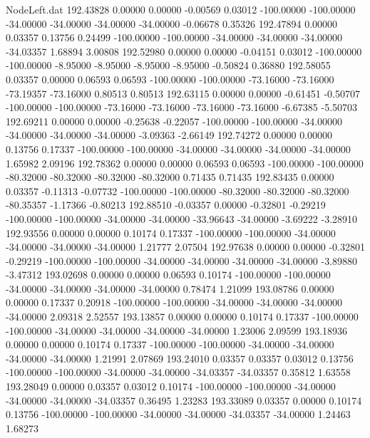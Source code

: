 \begin{filecontents}{NodeLeft.dat}
 192.43828    0.00000    0.00000    -0.00569    0.03012 -100.00000 -100.00000  -34.00000  -34.00000  -34.00000  -34.00000   -0.06678    0.35326
 192.47894    0.00000    0.03357     0.13756    0.24499 -100.00000 -100.00000  -34.00000  -34.00000  -34.00000  -34.03357    1.68894    3.00808
 192.52980    0.00000    0.00000    -0.04151    0.03012 -100.00000 -100.00000   -8.95000   -8.95000   -8.95000   -8.95000   -0.50824    0.36880
 192.58055    0.03357    0.00000     0.06593    0.06593 -100.00000 -100.00000  -73.16000  -73.16000  -73.19357  -73.16000    0.80513    0.80513
 192.63115    0.00000    0.00000    -0.61451   -0.50707 -100.00000 -100.00000  -73.16000  -73.16000  -73.16000  -73.16000   -6.67385   -5.50703
 192.69211    0.00000    0.00000    -0.25638   -0.22057 -100.00000 -100.00000  -34.00000  -34.00000  -34.00000  -34.00000   -3.09363   -2.66149
 192.74272    0.00000    0.00000     0.13756    0.17337 -100.00000 -100.00000  -34.00000  -34.00000  -34.00000  -34.00000    1.65982    2.09196
 192.78362    0.00000    0.00000     0.06593    0.06593 -100.00000 -100.00000  -80.32000  -80.32000  -80.32000  -80.32000    0.71435    0.71435
 192.83435    0.00000    0.03357    -0.11313   -0.07732 -100.00000 -100.00000  -80.32000  -80.32000  -80.32000  -80.35357   -1.17366   -0.80213
 192.88510   -0.03357    0.00000    -0.32801   -0.29219 -100.00000 -100.00000  -34.00000  -34.00000  -33.96643  -34.00000   -3.69222   -3.28910
 192.93556    0.00000    0.00000     0.10174    0.17337 -100.00000 -100.00000  -34.00000  -34.00000  -34.00000  -34.00000    1.21777    2.07504
 192.97638    0.00000    0.00000    -0.32801   -0.29219 -100.00000 -100.00000  -34.00000  -34.00000  -34.00000  -34.00000   -3.89880   -3.47312
 193.02698    0.00000    0.00000     0.06593    0.10174 -100.00000 -100.00000  -34.00000  -34.00000  -34.00000  -34.00000    0.78474    1.21099
 193.08786    0.00000    0.00000     0.17337    0.20918 -100.00000 -100.00000  -34.00000  -34.00000  -34.00000  -34.00000    2.09318    2.52557
 193.13857    0.00000    0.00000     0.10174    0.17337 -100.00000 -100.00000  -34.00000  -34.00000  -34.00000  -34.00000    1.23006    2.09599
 193.18936    0.00000    0.00000     0.10174    0.17337 -100.00000 -100.00000  -34.00000  -34.00000  -34.00000  -34.00000    1.21991    2.07869
 193.24010    0.03357    0.03357     0.03012    0.13756 -100.00000 -100.00000  -34.00000  -34.00000  -34.03357  -34.03357    0.35812    1.63558
 193.28049    0.00000    0.03357     0.03012    0.10174 -100.00000 -100.00000  -34.00000  -34.00000  -34.00000  -34.03357    0.36495    1.23283
 193.33089    0.03357    0.00000     0.10174    0.13756 -100.00000 -100.00000  -34.00000  -34.00000  -34.03357  -34.00000    1.24463    1.68273

\end{filecontents}
